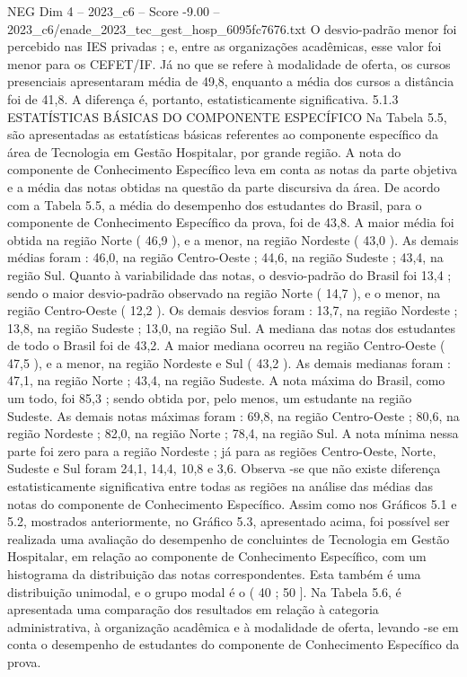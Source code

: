 \begin{textsample}{NEG Dim 4 – 2023\_c6 – Score -9.00 – 2023\_c6/enade\_2023\_tec\_gest\_hosp\_6095fc7676.txt}
O desvio-padrão menor foi percebido nas IES privadas ; e, entre as organizações acadêmicas, esse valor foi menor para os CEFET/IF.
Já no que se refere à modalidade de oferta, os cursos presenciais apresentaram média de 49,8, enquanto a média dos cursos a distância foi de 41,8.
A diferença é, portanto, estatisticamente significativa. 5.1.3 ESTATÍSTICAS BÁSICAS DO COMPONENTE ESPECÍFICO Na Tabela 5.5, são apresentadas as estatísticas básicas referentes ao componente específico da área de Tecnologia em Gestão Hospitalar, por grande região.
A nota do componente de Conhecimento Específico leva em conta as notas da parte objetiva e a média das notas obtidas na questão da parte discursiva da área.
De acordo com a Tabela 5.5, a média do desempenho dos estudantes do Brasil, para o componente de Conhecimento Específico da prova, foi de 43,8.
A maior média foi obtida na região Norte ( 46,9 ), e a menor, na região Nordeste ( 43,0 ).
As demais médias foram : 46,0, na região Centro-Oeste ; 44,6, na região Sudeste ; 43,4, na região Sul.
Quanto à variabilidade das notas, o desvio-padrão do Brasil foi 13,4 ; sendo o maior desvio-padrão observado na região Norte ( 14,7 ), e o menor, na região Centro-Oeste ( 12,2 ).
Os demais desvios foram : 13,7, na região Nordeste ; 13,8, na região Sudeste ; 13,0, na região Sul.
A mediana das notas dos estudantes de todo o Brasil foi de 43,2.
A maior mediana ocorreu na região Centro-Oeste ( 47,5 ), e a menor, na região Nordeste e Sul ( 43,2 ).
As demais medianas foram : 47,1, na região Norte ; 43,4, na região Sudeste.
A nota máxima do Brasil, como um todo, foi 85,3 ; sendo obtida por, pelo menos, um estudante na região Sudeste.
As demais notas máximas foram : 69,8, na região Centro-Oeste ; 80,6, na região Nordeste ; 82,0, na região Norte ; 78,4, na região Sul.
A nota mínima nessa parte foi zero para a região Nordeste ; já para as regiões Centro-Oeste, Norte, Sudeste e Sul foram 24,1, 14,4, 10,8 e 3,6.
Observa -se que não existe diferença estatisticamente significativa entre todas as regiões na análise das médias das notas do componente de Conhecimento Específico.
Assim como nos Gráficos 5.1 e 5.2, mostrados anteriormente, no Gráfico 5.3, apresentado acima, foi possível ser realizada uma avaliação do desempenho de concluintes de Tecnologia em Gestão Hospitalar, em relação ao componente de Conhecimento Específico, com um histograma da distribuição das notas correspondentes.
Esta também é uma distribuição unimodal, e o grupo modal é o ( 40 ; 50 ].
Na Tabela 5.6, é apresentada uma comparação dos resultados em relação à categoria administrativa, à organização acadêmica e à modalidade de oferta, levando -se em conta o desempenho de estudantes do componente de Conhecimento Específico da prova.

\end{textsample}
